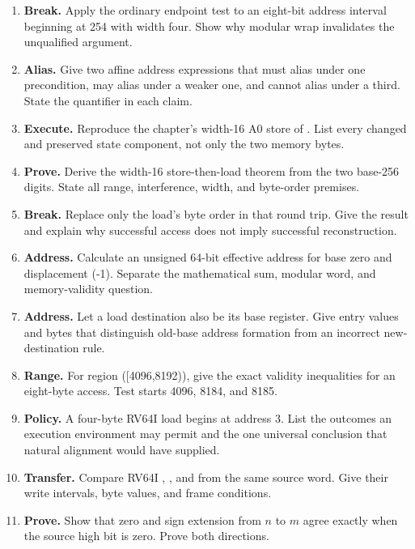 \begin{enumerate}
\item \textbf{Break.} Apply the ordinary endpoint test to an eight-bit address
interval beginning at 254 with width four. Show why modular wrap invalidates
the unqualified argument.

\item \textbf{Alias.} Give two affine address expressions that must alias
under one precondition, may alias under a weaker one, and cannot alias under a
third. State the quantifier in each claim.

\item \textbf{Execute.} Reproduce the chapter's width-16 A0 store of
. List every changed and preserved state component, not only the
two memory bytes.

\item \textbf{Prove.} Derive the width-16 store-then-load theorem from the two
base-256 digits. State all range, interference, width, and byte-order premises.

\item \textbf{Break.} Replace only the load's byte order in that round trip.
Give the result and explain why successful access does not imply successful
reconstruction.

\item \textbf{Address.} Calculate an unsigned 64-bit effective address for
base zero and displacement (-1). Separate the mathematical sum, modular word,
and memory-validity question.

\item \textbf{Address.} Let a load destination also be its base register.
Give entry values and bytes that distinguish old-base address formation from
an incorrect new-destination rule.

\item \textbf{Range.} For region ([4096,8192)), give the exact validity
inequalities for an eight-byte access. Test starts 4096, 8184, and 8185.

\item \textbf{Policy.} A four-byte RV64I load begins at address 3. List the
outcomes an execution environment may permit and the one universal conclusion
that natural alignment would have supplied.

\item \textbf{Transfer.} Compare RV64I , , and 
from the same source word. Give their write intervals, byte values, and frame
conditions.

\item \textbf{Prove.} Show that zero and sign extension from \(n\) to \(m\)
agree exactly when the source high bit is zero. Prove both directions.


\end{enumerate}
